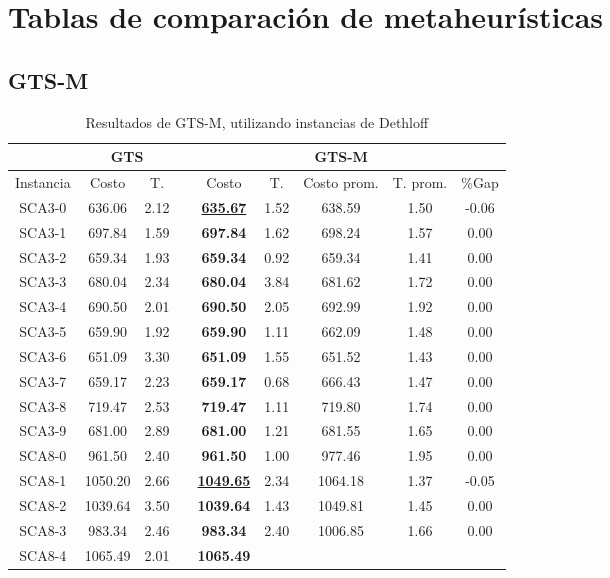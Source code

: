 \chapter{Tablas de comparación de metaheurísticas}\label{chap:apendiceB}

\section{GTS-M}\label{tablas-finales-gts}

\begin{table}[h]
\caption{ Resultados de GTS-M, utilizando instancias de Dethloff}
\centering
\scriptsize
\begin{tabular*}{1.00\textwidth}{@{\extracolsep{\fill}} |c||c c||c c c c c c|}
\hline
& \multicolumn{2}{c||}{\bf{GTS}} & \multicolumn{6}{c|}{\bf{GTS-M}}\\\hline
Instancia & Costo & T. & & Costo & T. & Costo prom. & T. prom. & \%Gap\\ [0.5ex]
\hline\hline
SCA3-0 & 636.06 & 2.12 & & \bf{\underline{635.67}} & 
1.52 & 638.59 & 1.50 & -0.06\\SCA3-1 & 697.84 & 1.59 & & \bf{697.84} & 
1.62 & 698.24 & 1.57 & 0.00\\SCA3-2 & 659.34 & 1.93 & & \bf{659.34} & 
0.92 & 659.34 & 1.41 & 0.00\\SCA3-3 & 680.04 & 2.34 & & \bf{680.04} & 
3.84 & 681.62 & 1.72 & 0.00\\SCA3-4 & 690.50 & 2.01 & & \bf{690.50} & 
2.05 & 692.99 & 1.92 & 0.00\\SCA3-5 & 659.90 & 1.92 & & \bf{659.90} & 
1.11 & 662.09 & 1.48 & 0.00\\SCA3-6 & 651.09 & 3.30 & & \bf{651.09} & 
1.55 & 651.52 & 1.43 & 0.00\\SCA3-7 & 659.17 & 2.23 & & \bf{659.17} & 
0.68 & 666.43 & 1.47 & 0.00\\SCA3-8 & 719.47 & 2.53 & & \bf{719.47} & 
1.11 & 719.80 & 1.74 & 0.00\\SCA3-9 & 681.00 & 2.89 & & \bf{681.00} & 
1.21 & 681.55 & 1.65 & 0.00\\SCA8-0 & 961.50 & 2.40 & & \bf{961.50} & 
1.00 & 977.46 & 1.95 & 0.00\\SCA8-1 & 1050.20 & 2.66 & & \bf{\underline{1049.65}} & 
2.34 & 1064.18 & 1.37 & -0.05\\SCA8-2 & 1039.64 & 3.50 & & \bf{1039.64} & 
1.43 & 1049.81 & 1.45 & 0.00\\SCA8-3 & 983.34 & 2.46 & & \bf{983.34} & 
2.40 & 1006.85 & 1.66 & 0.00\\SCA8-4 & 1065.49 & 2.01 & & \bf{1065.49} & 

\end{tabular*}
\end{table}
